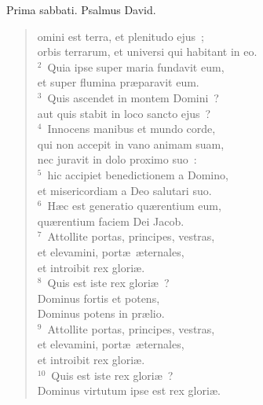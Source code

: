 \bchapter[Psalm]
Prima sabbati. Psalmus David. \begin{verse}omini est terra, et plenitudo ejus~;\\ orbis terrarum, et universi qui habitant in eo.\\
${}^{2}$~Quia ipse super maria fundavit eum,\\ et super flumina pr\ae paravit eum.\\
${}^{3}$~Quis ascendet in montem Domini~?\\ aut quis stabit in loco sancto ejus~?\\
${}^{4}$~Innocens manibus et mundo corde,\\ qui non accepit in vano animam suam,\\ nec juravit in dolo proximo suo~:\\
${}^{5}$~hic accipiet benedictionem a Domino,\\ et misericordiam a Deo salutari suo.\\
${}^{6}$~H\ae c est generatio qu\ae rentium eum,\\ qu\ae rentium faciem Dei Jacob.\\
${}^{7}$~Attollite portas, principes, vestras,\\ et elevamini, port\ae\ \ae ternales,\\ et introibit rex glori\ae .\\
${}^{8}$~Quis est iste rex glori\ae~?\\ Dominus fortis et potens,\\ Dominus potens in pr\ae lio.\\
${}^{9}$~Attollite portas, principes, vestras,\\ et elevamini, port\ae\ \ae ternales,\\ et introibit rex glori\ae .\\
${}^{10}$~Quis est iste rex glori\ae~?\\ Dominus virtutum ipse est rex glori\ae .\end{verse}



